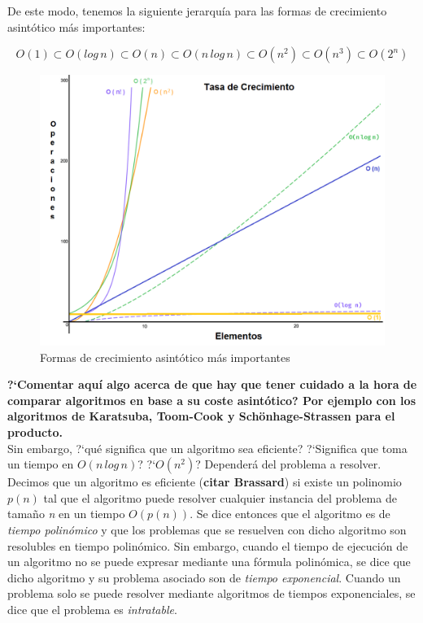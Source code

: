 \documentclass[a4paper, 12pt, oneside]{book}
\begin{document}
	De este modo, tenemos la siguiente jerarqu\'ia para las formas de crecimiento asint\'otico m\'as importantes:
	
	$$ O(1) \subset O(log\,n) \subset O(n) \subset O(n\,log\,n) \subset O(n^{2}) \subset O(n^{3}) \subset O(2^{n}) $$
	
	\begin{figure}[h]
		\centering
		\includegraphics[scale = 0.4]{grafico-complejidad-computacionala3.png}
		\caption{Formas de crecimiento asint\'otico m\'as importantes}
		\label{fig:complejidad}
	\end{figure}
	
	\textbf{?`Comentar aqu\'i algo acerca de que hay que tener cuidado a la hora de comparar algoritmos en base a su coste asint\'otico? Por ejemplo con los algoritmos de Karatsuba, Toom-Cook y Sch\"onhage-Strassen para el producto.}
	\\
	
	Sin embargo, ?`qu\'e significa que un algoritmo sea eficiente? ?`Significa que toma un tiempo en $O(n\,log\,n)$? ?`$O(n^{2})$? Depender\'a del problema a resolver.
	\\
	
	Decimos que un algoritmo es eficiente (\textbf{citar Brassard}) si existe un polinomio $p(n)$ tal que el algoritmo puede resolver cualquier instancia del problema de tama\~{n}o \textit{n} en un tiempo $O(p(n))$. Se dice entonces que el algoritmo es de \textit{tiempo polin\'omico} y que los problemas que se resuelven con dicho algoritmo son resolubles en tiempo polin\'omico. Sin embargo, cuando el tiempo de ejecuci\'on de un algoritmo no se puede expresar mediante una f\'ormula polin\'omica, se dice que dicho algoritmo y su problema asociado son de \textit{tiempo exponencial}. Cuando un problema solo se puede resolver mediante algoritmos de tiempos exponenciales, se dice que el problema es \textit{intratable}.
	\\
	
\end{document}

